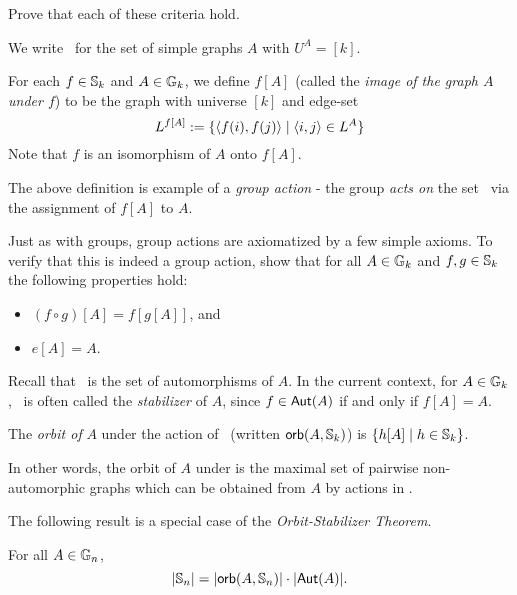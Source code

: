 \begin{aside}
Prove that each of these criteria hold. 
\end{aside}

\begin{definition}
We write \ for the set of simple graphs $A$ with $U^A = [k]$.
\end{definition}

\begin{definition}
For each $f\in\mbox{$\mathbb{S}_{k}$}$ and $A\in\mbox{$\mathbb{G}_{k}$}$, we define $f[A]$ (called the \emph{image of the graph $A$ under $f$}) to be the graph with universe $[k]$ and edge-set
\[
    L^{f[A]} := \{\mbox{$\langle f(i),f(j) \rangle$} \mid \mbox{$\langle i,j \rangle$} \in L^A\}
\]
Note that $f$ is an isomorphism of $A$ onto $f[A]$.
\end{definition}

The above definition is example of a \emph{group action} - the group  \emph{acts on} the set \ via the assignment of $f[A]$ to $A$. 

\begin{aside}
    Just as with groups, group actions are axiomatized by a few simple axioms. To verify that this is indeed a group action, show that for all $A\in\mbox{$\mathbb{G}_{k}$}$ and $f,g\in\mbox{$\mathbb{S}_{k}$}$ the following properties hold:
    \begin{itemize}
    \item
    $(f\circ g)[A]=f[g[A]]$, and 
    \item
    $e[A]=A$.
    \end{itemize}    
\end{aside}


Recall that \ is the set of automorphisms of $A$. In the current context, for $A\in \mbox{$\mathbb{G}_{k}$}$, \ is often called the \emph{stabilizer} of $A$, since $f\in\mbox{$\mathsf{Aut}(A)$}$ if and only if $f[A] =A$. 

\begin{definition}
The \emph{orbit of} $A$  under the action of \ (written $\mbox{$\mathsf{orb}(A,\mbox{$\mathbb{S}_{k}$})$}$) is $\{h[A]\mid h\in\mbox{$\mathbb{S}_{k}$}\}$. 

In other words, the orbit of $A$ under  is the maximal set of pairwise non-automorphic graphs which can be obtained from $A$ by actions in . 
\end{definition}

The following result is a special case of the \emph{Orbit-Stabilizer Theorem}.
\begin{theorem}\label{orb-stab-thm}
For all $A\in\mbox{$\mathbb{G}_{n}$}$,
\[
\mbox{$|\mbox{$\mathbb{S}_{n}$}|$}=\mbox{$|\mbox{$\mathsf{orb}(A,\mbox{$\mathbb{S}_{n}$})$}|$}\cdot\mbox{$|\mbox{$\mathsf{Aut}(A)$}|$}.
\]
\end{theorem}

